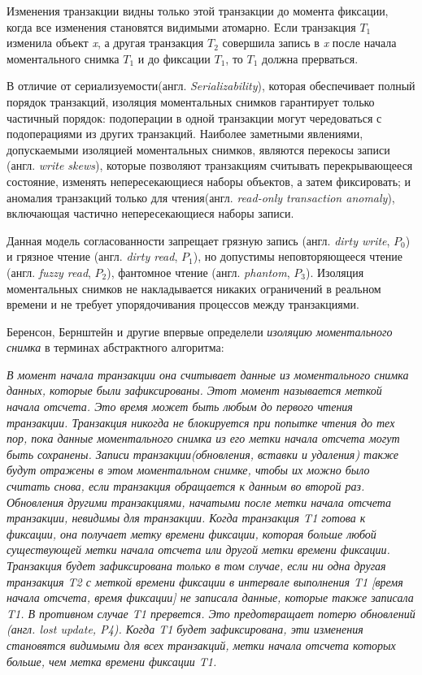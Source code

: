 \documentclass[12pt,  openany]{book}
\begin{document}
\par Изменения транзакции видны только этой транзакции до момента фиксации, когда все изменения становятся видимыми атомарно. Если транзакция $T_1$ изменила объект \textit{x}, а другая транзакция $T_2$ совершила запись в \textit{x} после начала моментального снимка $T_1$ и до фиксации $T_1$, то $T_1$ должна прерваться.
\par
В отличие от сериализуемости(англ. \textit{Serializability}), которая обеспечивает полный порядок транзакций, изоляция моментальных снимков гарантирует только частичный порядок: подоперации в одной транзакции могут чередоваться с подоперациями из других транзакций. Наиболее заметными явлениями, допускаемыми изоляцией моментальных снимков, являются перекосы записи (англ. \textit{write skews}), которые позволяют транзакциям считывать перекрывающееся состояние, изменять непересекающиеся наборы объектов, а затем фиксировать; и аномалия транзакций только для чтения(англ.  \textit{read-only transaction anomaly}), включающая частично непересекающиеся наборы записи.
\par
Данная модель согласованности запрещает грязную запись (англ. \textit{dirty write}, $P_0$) и грязное чтение (англ.  \textit{dirty read}, $P_1$), но допустимы неповторяющееся чтение (англ. \textit{fuzzy read}, $P_2$), фантомное чтение (англ. \textit{phantom}, $P_3$)\cite{adya99:_weak_consis}. Изоляция моментальных снимков не накладывается никаких ограничений в реальном времени и не требует упорядочивания процессов между транзакциями.
\par Беренсон, Бернштейн и другие \cite {BerensonIsolationLevels} впервые определели \textit{изоляцию моментального снимка} в терминах абстрактного алгоритма: 
\begin{displayquote}
\textit{В момент начала транзакции она считывает данные из моментального снимка данных, которые были зафиксированы. Этот момент называется меткой начала отсчета. Это время может быть любым до первого чтения транзакции. Транзакция никогда не блокируется при попытке чтения до тех пор, пока данные моментального снимка из его метки начала отсчета могут быть сохранены. Записи транзакции(обновления, вставки и удаления) также будут отражены в этом моментальном снимке, чтобы их можно было считать снова, если транзакция обращается к данным во второй раз. Обновления другими транзакциями, начатыми после метки начала отсчета транзакции, невидимы для транзакции. 
\newline \newline
Когда транзакция T1 готова к фиксации, она получает метку времени фиксации, которая больше любой существующей метки начала отсчета или другой метки времени фиксации. Транзакция будет зафиксирована только в том случае, если ни одна другая транзакция T2 с меткой времени фиксации в интервале выполнения T1 [время начала отсчета, время фиксации] не записала данные, которые также записала T1. В противном случае T1 прервется. Это предотвращает потерю обновлений (англ. \textit{lost update}, P4). Когда T1 будет зафиксирована, эти изменения становятся видимыми для всех транзакций, метки начала отсчета которых больше, чем метка времени фиксации T1.
}
\end{displayquote}
\end{document}
